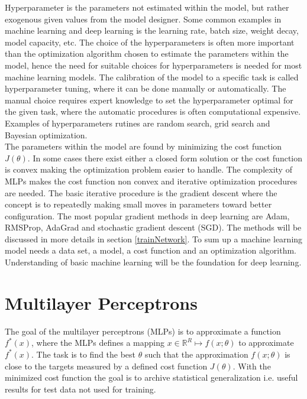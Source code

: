 Hyperparameter is the parameters not estimated within the model, but rather exogenous given values from the model designer. Some common examples in machine learning and deep learning is the learning rate, batch size, weight decay, model capacity, etc. The choice of the hyperparameters is often more important than the optimization algorithm chosen to estimate the parameters within the model, hence the need for suitable choices for hyperparameters is needed for most machine learning models. The calibration of the model to a specific task is called hyperparameter tuning, where it can be done manually or automatically. The manual choice requires expert knowledge to set the hyperparameter optimal for the given task, where the automatic procedures is often computational expensive. Examples of hyperparameters rutines are random search, grid search and Bayesian optimization.\\

The parameters within the model are found by minimizing the cost function $J(\theta)$. In some cases there exist either a closed form solution or the cost function is convex making the optimization problem easier to handle. The complexity of MLPs makes the cost function non convex and iterative optimization procedures are needed. The basic iterative procedure is the gradient descent where the concept is to repeatedly making small moves in parameters toward better configuration. The most popular gradient methods in deep learning are Adam, RMSProp, AdaGrad and stochastic gradient descent (SGD). The methods will be discussed in more details in section \ref{trainNetwork}. To sum up a machine learning model needs a data set, a model, a cost function and an optimization algorithm. Understanding of basic machine learning will be the foundation for deep learning.



\section{Multilayer Perceptrons}\label{multilayerPerceptron}
The goal of the multilayer perceptrons (MLPs) is to approximate a function $f^*(x)$, where the MLPs defines a mapping $x\in \mathbb{R}^R \mapsto f(x;\theta)$ to approximate $f^*(x)$. The task is to find the best $\theta$ such that the approximation $f(x;\theta)$ is close to the targets measured by a defined cost function $J(\theta)$. With the minimized cost function the goal is to archive statistical generalization i.e. useful results for test data not used for training. \\

